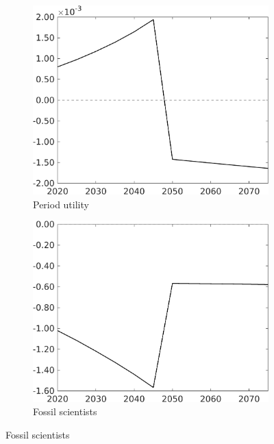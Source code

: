 \begin{figure}[h!!!]
\begin{subfigure}{0.32\textwidth}
	\end{subfigure}
	\begin{subfigure}{0.32\textwidth}
		\caption{Period utility}
		\includegraphics[width=1\textwidth]{../../codding_model/own_basedOnFried/optimalPol_010922_revision/figures/all_13Sept22_Tplus30/SWF_OPT_COMPtaulPer_regime4_spillover0_knspil1_noskill0_sep0_xgrowth0_PV1_etaa0.79.png}
	\end{subfigure}	
	\begin{subfigure}{0.32\textwidth}
		\caption{Fossil scientists}
		\includegraphics[width=1\textwidth]{../../codding_model/own_basedOnFried/optimalPol_010922_revision/figures/all_13Sept22_Tplus30/sff_OPT_COMPtaulPer_regime4_spillover0_knspil1_noskill0_sep0_xgrowth0_PV1_etaa0.79.png}

\end{subfigure}
\end{figure}
